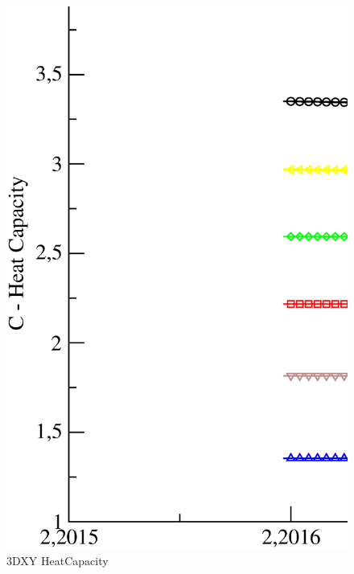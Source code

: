 \begin{figure}[!htpb]
  \centering
  \includegraphics[width=\textwidth]{./plots/3DXY/vsT/HeatCapacity.eps}
  \caption{3DXY HeatCapacity}
\end{figure}

